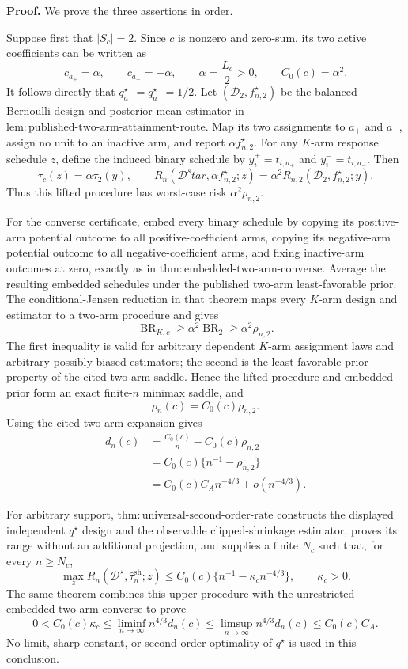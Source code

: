 \textbf{Proof.}
We prove the three assertions in order.

Suppose first that \(|S_c|=2\).  Since \(c\) is nonzero and zero-sum, its two active coefficients can be written as
\[
 c_{a_+}=\alpha,
 \qquad c_{a_-}=-\alpha,
 \qquad
 \alpha=\frac{L_c}{2}>0,
 \qquad
 C_0(c)=\alpha^2.
\]
It follows directly that \(q_{a_+}^\star=q_{a_-}^\star=1/2\).  Let \((\mathcal D_2,f_{n,2}^\star)\) be the balanced Bernoulli design and posterior-mean estimator in \(\mathrm{lem:published\text{-}two\text{-}arm\text{-}attainment\text{-}route}\).  Map its two assignments to \(a_+\) and \(a_-\), assign no unit to an inactive arm, and report \(\alpha f_{n,2}^\star\).  For any \(K\)-arm response schedule \(z\), define the induced binary schedule by \(y_i^+=t_{i,a_+}\) and \(y_i^-=t_{i,a_-}\).  Then
\[
 \tau_c(z)=\alpha\tau_2(y),
 \qquad
 R_n(\mathcal D^star,\alpha f_{n,2}^\star;z)
 =\alpha^2R_{n,2}(\mathcal D_2,f_{n,2}^\star;y).
\]
Thus this lifted procedure has worst-case risk \(\alpha^2\rho_{n,2}\).

For the converse certificate, embed every binary schedule by copying its positive-arm potential outcome to all positive-coefficient arms, copying its negative-arm potential outcome to all negative-coefficient arms, and fixing inactive-arm outcomes at zero, exactly as in \(\mathrm{thm:embedded\text{-}two\text{-}arm\text{-}converse}\).  Average the resulting embedded schedules under the published two-arm least-favorable prior.  The conditional-Jensen reduction in that theorem maps every \(K\)-arm design and estimator to a two-arm procedure and gives
\[
 \operatorname{BR}_{K,c}
 \geq \alpha^2\operatorname{BR}_{2}
 \geq \alpha^2\rho_{n,2}.
\]
The first inequality is valid for arbitrary dependent \(K\)-arm assignment laws and arbitrary possibly biased estimators; the second is the least-favorable-prior property of the cited two-arm saddle.  Hence the lifted procedure and embedded prior form an exact finite-\(n\) minimax saddle, and
\[
 \rho_n(c)=C_0(c)\rho_{n,2}.
\]
Using the cited two-arm expansion gives
\[
 \begin{aligned}
 d_n(c)
 &=\frac{C_0(c)}n-C_0(c)\rho_{n,2}\\
 &=C_0(c)\{n^{-1}-\rho_{n,2}\}\\
 &=C_0(c)C_A n^{-4/3}+o(n^{-4/3}).
 \end{aligned}
\]

For arbitrary support, \(\mathrm{thm:universal\text{-}second\text{-}order\text{-}rate}\) constructs the displayed independent \(q^\star\) design and the observable clipped-shrinkage estimator, proves its range without an additional projection, and supplies a finite \(N_c\) such that, for every \(n\geq N_c\),
\[
 \max_zR_n(\mathcal D^\star,\widehat\tau_n^{\mathrm{sh}};z)
 \leq C_0(c)\{n^{-1}-\kappa_cn^{-4/3}\},
 \qquad \kappa_c>0.
\]
The same theorem combines this upper procedure with the unrestricted embedded two-arm converse to prove
\[
 0<C_0(c)\kappa_c
 \leq\liminf_{n\to\infty}n^{4/3}d_n(c)
 \leq\limsup_{n\to\infty}n^{4/3}d_n(c)
 \leq C_0(c)C_A.
\]
No limit, sharp constant, or second-order optimality of \(q^\star\) is used in this conclusion.

